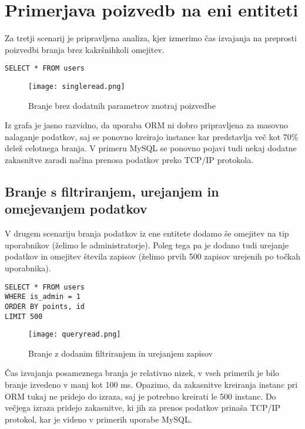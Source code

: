 \documentclass[a4paper,12pt,openright]{book}
\begin{document}
    \section{Primerjava poizvedb na eni entiteti}

    Za tretji scenarij je pripravljena analiza, kjer izmerimo čas izvajanja na preprosti poizvedbi branja brez kakršnihkoli omejitev.
    
\begin{verbatim}
SELECT * FROM users
\end{verbatim}
    

    \begin{figure}[H]
        \centerline{\texttt{[image: singleread.png]}}
        \caption{Branje brez dodatnih parametrov znotraj poizvedbe}
        \label{branje}
    \end{figure}

    \noindent
    Iz grafa je jasno razvidno, da uporaba ORM ni dobro pripravljena za masovno nalaganje podatkov, saj se ponovno kreirajo instance kar predstavlja več kot 70\% delež celotnega branja. V primeru MySQL se ponovno pojavi tudi nekaj dodatne zakasnitve zaradi načina prenosa podatkov preko TCP/IP protokola.

    \subsection{Branje s filtriranjem, urejanjem in omejevanjem podatkov}

    V drugem scenariju branja podatkov iz ene entitete dodamo še omejitev na tip uporabnikov (želimo le administratorje). Poleg tega pa je dodano tudi urejanje podatkov in omejitev števila zapisov (želimo prvih 500 zapisov urejenih po točkah uporabnika).

\begin{verbatim}
SELECT * FROM users
WHERE is_admin = 1
ORDER BY points, id
LIMIT 500
\end{verbatim}
    
    \begin{figure}[H]
        \centerline{\texttt{[image: queryread.png]}}
        \caption{Branje z dodanim filtriranjem in urejanjem zapisov}
        \label{queryread}
    \end{figure}

    \noindent
    Čas izvajanja posameznega branja je relativno nizek, v vseh primerih je bilo branje izvedeno v manj kot 100 ms. Opazimo, da zakasnitve kreiranja instanc pri ORM tukaj ne pridejo do izraza, saj je potrebno kreirati le 500 instanc. Do večjega izraza pridejo zakasnitve, ki jih za prenos podatkov prinaša TCP/IP protokol, kar je videno v primerih uporabe MySQL.
\end{document}
